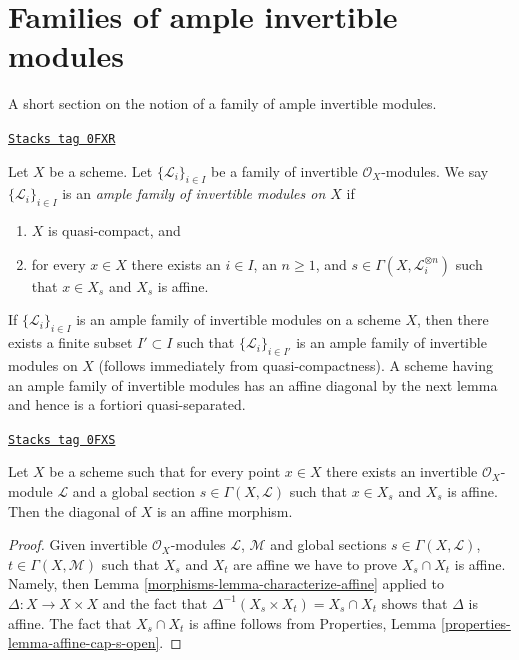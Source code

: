 \section{Families of ample invertible modules}
\label{morphisms-section-families-ample-invertible-modules}
A short section on the notion of a family of ample invertible modules.

\begin{definition}
\label{morphisms-definition-family-ample-invertible-modules}
\href{https://stacks.math.columbia.edu/tag/0FXR}{\texttt{Stacks tag 0FXR}}

\begin{reference}
\cite[II Definition 2.2.4]{SGA6}
\end{reference}
Let $X$ be a scheme. Let $\{\mathcal{L}_i\}_{i \in I}$
be a family of invertible $\mathcal{O}_X$-modules. We say
$\{\mathcal{L}_i\}_{i \in I}$ is an
{\it ample family of invertible modules on $X$} if
\begin{enumerate}
\item $X$ is quasi-compact, and
\item for every $x \in X$ there exists an $i \in I$, an $n \geq 1$,
and $s \in \Gamma(X, \mathcal{L}_i^{\otimes n})$ such
that $x \in X_s$ and $X_s$ is affine.
\end{enumerate}
\end{definition}

If $\{\mathcal{L}_i\}_{i \in I}$ is an ample family of invertible
modules on a scheme $X$, then there exists a finite subset $I' \subset I$ such
that $\{\mathcal{L}_i\}_{i \in I'}$ is an ample family of invertible
modules on $X$ (follows immediately from quasi-compactness).
A scheme having an ample family of invertible modules has an affine
diagonal by the next lemma and hence is a fortiori quasi-separated.

\begin{lemma}
\label{morphisms-lemma-affine-diagonal}
\href{https://stacks.math.columbia.edu/tag/0FXS}{\texttt{Stacks tag 0FXS}}

Let $X$ be a scheme such that for every point $x \in X$ there exists
an invertible $\mathcal{O}_X$-module $\mathcal{L}$ and a global
section $s \in \Gamma(X, \mathcal{L})$ such that $x \in X_s$ and
$X_s$ is affine. Then the diagonal of $X$ is an affine morphism.
\end{lemma}

\begin{proof}

Given invertible $\mathcal{O}_X$-modules $\mathcal{L}$, $\mathcal{M}$
and global sections $s \in \Gamma(X, \mathcal{L})$,
$t \in \Gamma(X, \mathcal{M})$ such that $X_s$ and $X_t$ are affine
we have to prove $X_s \cap X_t$ is affine. Namely, then
Lemma \ref{morphisms-lemma-characterize-affine}
applied to $\Delta : X \to X \times X$ and the fact that
$\Delta^{-1}(X_s \times X_t) = X_s \cap X_t$ shows that $\Delta$
is affine. The fact that $X_s \cap X_t$ is affine follows from
Properties, Lemma \ref{properties-lemma-affine-cap-s-open}.
\end{proof}

